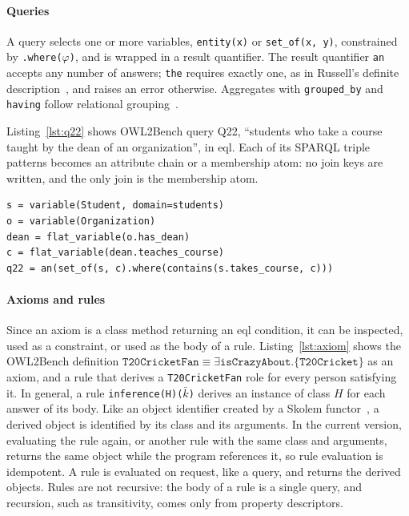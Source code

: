 \documentclass[sigconf,anonymous]{aamas}
\begin{document}
\paragraph{Queries}
A query selects one or more variables, \texttt{entity(x)} or \texttt{set\_of(x, y)}, constrained by \texttt{.where($\varphi$)}, and is wrapped in a result quantifier. The result quantifier \texttt{an} accepts any number of answers; \texttt{the} requires exactly one, as in Russell's definite description~\cite{russell1905denoting}, and raises an error otherwise. Aggregates with \texttt{grouped\_by} and \texttt{having} follow relational grouping~\cite{Klug1982}.

Listing~\ref{lst:q22} shows OWL2Bench query Q22, ``students who take a course taught by the dean of an organization'', in \ac{eql}. Each of its SPARQL triple patterns becomes an attribute chain or a membership atom: no join keys are written, and the only join is the membership atom.

\begin{lstlisting}[style=eql, caption={OWL2Bench query Q22 in \acs{eql}.}, label={lst:q22}]
s = variable(Student, domain=students)
o = variable(Organization)
dean = flat_variable(o.has_dean)
c = flat_variable(dean.teaches_course)
q22 = an(set_of(s, c).where(contains(s.takes_course, c)))
\end{lstlisting}

\paragraph{Axioms and rules}
Since an axiom is a class method returning an \ac{eql} condition, it can be inspected, used as a constraint, or used as the body of a rule. Listing~\ref{lst:axiom} shows the OWL2Bench definition $\texttt{T20CricketFan}\equiv\exists\texttt{isCrazyAbout}.\{\texttt{T20Cricket}\}$ as an axiom, and a rule that derives a \texttt{T20CricketFan} role for every person satisfying it. In general, a rule \texttt{inference(H)($\bar k$)} derives an instance of class $H$ for each answer of its body. Like an object identifier created by a Skolem functor~\cite{hull1990ilog}, a derived object is identified by its class and its arguments. In the current version, evaluating the rule again, or another rule with the same class and arguments, returns the same object while the program references it, so rule evaluation is idempotent. A rule is evaluated on request, like a query, and returns the derived objects. Rules are not recursive: the body of a rule is a single query, and recursion, such as transitivity, comes only from property descriptors.
\end{document}
